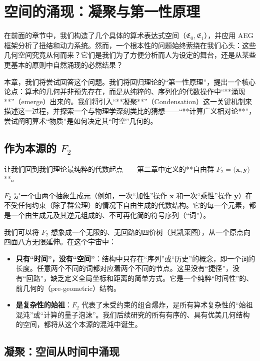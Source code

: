 \documentclass[a4paper,12pt]{book}
\numberwithin{problem}{section}
\numberwithin{definition}{section}
\numberwithin{lemma}{section}
\numberwithin{proposition}{section}
\numberwithin{theorem}{section}
\numberwithin{grammar}{section}
\numberwithin{program}{section}
\numberwithin{convention}{section}
\numberwithin{corollary}{section}
\begin{document}
\chapter{空间的涌现：凝聚与第一性原理}
\label{chap:emergence_of_space}

在前面的章节中，我们构造了几个具体的算术表达式空间（$\mathfrak{E}_0, \mathfrak{E}_1$），并应用 AEG 框架分析了扭结和动力系统。然而，一个根本性的问题始终萦绕在我们心头：这些几何空间究竟从何而来？它们是我们为了方便分析而人为设定的舞台，还是从某些更基本的原则中自然涌现的必然结果？

本章，我们将尝试回答这个问题。我们将回归理论的“第一性原理”，提出一个核心论点：算术的几何并非预先存在，而是从纯粹的、序列化的代数操作中“**涌现**”（emerge）出来的。我们将引入“**凝聚**”（Condensation）这一关键机制来描述这一过程，并探索一个与物理学深刻类比的猜想——“**计算广义相对论**”，尝试阐明算术“物质”是如何决定其“时空”几何的。

\section{作为本源的 \texorpdfstring{$F_2$}{F2}}
\label{sec:f2_as_source}

让我们回到我们理论最纯粹的代数起点——第二章中定义的**自由群 $F_2 = \langle \mathbf{x}, \mathbf{y} \rangle$**。

$F_2$ 是一个由两个抽象生成元（例如，一次“加性”操作 $\mathbf{x}$ 和一次“乘性”操作 $\mathbf{y}$）在不受任何约束（除了群公理）的情况下自由生成的代数结构。它的每一个元素，都是一个由生成元及其逆元组成的、不可再化简的符号序列（“词”）。

我们可以将 $F_2$ 想象成一个无限的、无回路的四价树（其凯莱图），从一个原点向四面八方无限延伸。在这个宇宙中：
\begin{itemize}
    \item \textbf{只有“时间”，没有“空间”}：结构中只存在“序列”或“历史”的概念，即一个词的长度。任意两个不同的词都对应着两个不同的节点。这里没有“捷径”，没有“回路”，缺乏定义全局坐标和距离的简单方式。它是一个纯粹“时间性”的、前几何的（pre-geometric）结构。
    \item \textbf{是复杂性的始祖}：$F_2$ 代表了未受约束的组合爆炸，是所有算术复杂性的“始祖混沌”或“计算的量子泡沫”。我们后续研究的所有有序的、具有优美几何结构的空间，都将从这个本源的混沌中诞生。
\end{itemize}

\section{凝聚：空间从时间中涌现}
\label{sec:condensation}
\end{document}
